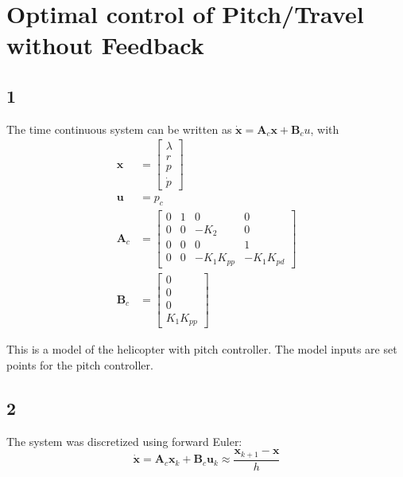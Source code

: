 \section{Optimal control of Pitch/Travel without Feedback}
\subsection{1}
The time continuous system can be written as $\mathbf{\dot{x}} = \mathbf{A}_c\mathbf{x}+ \mathbf{B}_c u$, with
\begin{subequations}
    \begin{align}
        \mathbf{x} &= \begin{bmatrix}
            \lambda\\
            r\\
            p\\
            \dot{p}
        \end{bmatrix}\\
        \mathbf{u} &= p_c \\
        \mathbf{A}_c &= \begin{bmatrix}
            0 & 1 & 0 & 0\\
            0 & 0 & -K_2 & 0\\
            0 & 0 & 0 & 1\\
            0 & 0& -K_1K_{pp} & -K_1K_{pd}
        \end{bmatrix} \\
        \mathbf{B}_c &= \begin{bmatrix}
            0\\
            0\\
            0\\
            K_1K_{pp}
        \end{bmatrix}
    \end{align}
\end{subequations}

This is a model of the helicopter with pitch controller. The model inputs are set points for the pitch controller.

\subsection{2}
The system was discretized using forward Euler:
\begin{equation}
    \mathbf{\dot{x}} = \mathbf{A}_c\mathbf{x}_k + \mathbf{B}_c\mathbf{u}_k \approx \frac{\mathbf{x}_{k+1}-\mathbf{x}}{h}
\end{equation}

